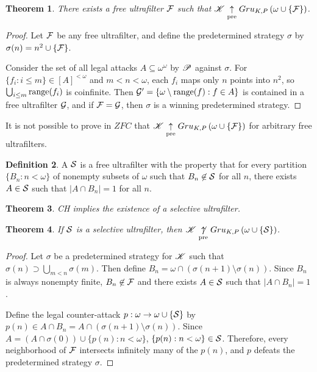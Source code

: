 \documentclass{amsart}
\newtheorem{theorem}{Theorem}[section]
\theoremstyle{definition}
\newtheorem{definition}[theorem]{Definition}
\begin{document}
\begin{theorem}
  There exists a free ultrafilter \(\mathcal{F}\) such that
  \(\mathscr{K}\underset{\text{pre}}{\uparrow} Gru_{K,P}\left({\omega\cup\{\mathcal{F}\}}\right)\).
\end{theorem}

\begin{proof}
  Let \(\mathcal{F}\) be any free ultrafilter, and
  define the predetermined strategy \(\sigma\) by
  \(\sigma(n)=n^2\cup\{\mathcal{F}\}\).

  Consider the set of all legal attacks \(A\subseteq\omega^\omega\) by
  \(\mathscr{P}\) against \(\sigma\). For \(\{f_i:i\leq m\}\in [A]^{<\omega}\) and
  \(m<n<\omega\), each \(f_i\) maps only \(n\) points into \(n^2\), so
  \(\bigcup_{i\leq m}\text{range}(f_i)\) is coinfinite.
  Then \(\mathcal{G}'=\{\omega\setminus\text{range}(f) : f\in A\}\) is contained in a free
  ultrafilter \(\mathcal{G}\), and if \(\mathcal{F}=\mathcal{G}\), then \(\sigma\) is a
  winning predetermined strategy.
\end{proof}

It is not possible to prove in \(ZFC\) that
\(\mathscr{K}\underset{\text{pre}}{\uparrow} Gru_{K,P}\left({\omega\cup\{\mathcal{F}\}}\right)\)
for arbitrary free ultrafilters.

\begin{definition}
  A  \(\mathcal{S}\) is a free ultrafilter with the
  property that for every
  partition \(\{B_n : n < \omega\}\) of nonempty subsets of \(\omega\) such that
  \(B_n \not\in \mathcal{S}\) for all \(n\), there exists \(A \in \mathcal{S}\) such
  that \(|A \cap B_n|=1\) for all \(n\).
\end{definition}

\begin{theorem}
  CH implies the existence of a selective ultrafilter.
  \cite{MR0080902}
\end{theorem}

\begin{theorem}
  If \(\mathcal{S}\) is a selective ultrafilter, then
  \(\mathscr{K}\underset{\text{pre}}{\not\uparrow} Gru_{K,P}\left({\omega\cup\{\mathcal{S}\}}\right)\).
\end{theorem}

\begin{proof}
  Let \(\sigma\) be a predetermined strategy for \(\mathscr{K}\) such that
  \(\sigma(n)\supset\bigcup_{m<n}\sigma(m)\).
  Then define \(B_n=\omega\cap(\sigma(n+1)\setminus\sigma(n))\). Since \(B_n\)
  is always nonempty finite, \(B_n\not\in\mathcal{F}\) and there exists \(A\in \mathcal{S}\)
  such that \(|A\cap B_n|=1\).

  Define the legal counter-attack \(p:\omega\to\omega\cup\{\mathcal{S}\}\) by
  \(p(n)\in A\cap B_n=A\cap(\sigma(n+1)\setminus\sigma(n))\). Since
  \(A=(A\cap\sigma(0))\cup\{p(n):n<\omega\}\), \(\{p(n):n<\omega\}\in\mathcal{S}\).
  Therefore, every neighborhood of \(\mathcal{F}\) intersects infinitely many of
  the \(p(n)\), and \(p\) defeats the predetermined strategy \(\sigma\).
\end{proof}
\end{document}
